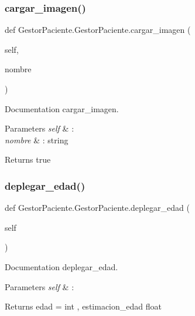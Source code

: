 \subsubsection{\texorpdfstring{cargar\+\_\+imagen()}{cargar\_imagen()}}
{\footnotesize\ttfamily def Gestor\+Paciente.\+Gestor\+Paciente.\+cargar\+\_\+imagen (\begin{DoxyParamCaption}\item[{}]{self,  }\item[{}]{nombre }\end{DoxyParamCaption})}



Documentation cargar\+\_\+imagen. 


\begin{DoxyParams}{Parameters}
{\em self} & \+: \\
\hline
{\em nombre} & \+: string \\
\hline
\end{DoxyParams}
\begin{DoxyReturn}{Returns}
true 
\end{DoxyReturn}
\mbox{\label{class_gestor_paciente_1_1_gestor_paciente_a2b0aa34c8b8369a735086f1ddc6e2e54}} 
\subsubsection{\texorpdfstring{deplegar\+\_\+edad()}{deplegar\_edad()}}
{\footnotesize\ttfamily def Gestor\+Paciente.\+Gestor\+Paciente.\+deplegar\+\_\+edad (\begin{DoxyParamCaption}\item[{}]{self }\end{DoxyParamCaption})}



Documentation deplegar\+\_\+edad. 


\begin{DoxyParams}{Parameters}
{\em self} & \+: \\
\hline
\end{DoxyParams}
\begin{DoxyReturn}{Returns}
edad = int , estimacion\+\_\+edad float 
\end{DoxyReturn}
\mbox{\label{class_gestor_paciente_1_1_gestor_paciente_ae1b7d499286433f0b1af88907fde7115}} 
